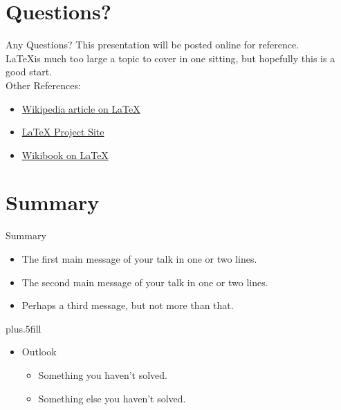 \documentclass{beamer}
\begin{document}
\section*{Questions?}

\begin{frame}{Any Questions?}
  This presentation will be posted online for reference.\\
  
  \LaTeX is much too large a topic to cover in one sitting, but hopefully this is a good start.\\
  
  Other References:
  \begin{itemize}
    \item \href{http://en.wikipedia.org/wiki/LaTeX}{Wikipedia article on \LaTeX}
    \item \href{http://www.latex-project.org/}{\LaTeX{ }Project Site}
    \item \href{http://en.wikibooks.org/wiki/LaTeX/}{Wikibook on \LaTeX}
  \end{itemize}
\end{frame}



\section*{Summary}

\begin{frame}{Summary}

  \begin{itemize}
  \item
    The \alert{first main message} of your talk in one or two lines.
  \item
    The \alert{second main message} of your talk in one or two lines.
  \item
    Perhaps a \alert{third message}, but not more than that.
  \end{itemize}
  
  \vskip0pt plus.5fill
  \begin{itemize}
  \item
    Outlook
    \begin{itemize}
    \item
      Something you haven't solved.
    \item
      Something else you haven't solved.
    \end{itemize}
  \end{itemize}
\end{frame}
\end{document}
